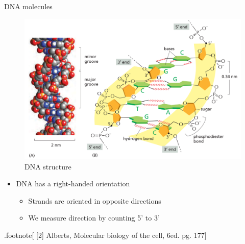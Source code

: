 \documentclass[
  ignorenonframetext,
]{beamer}
\providecommand{\tightlist}{%
  \setlength{\itemsep}{0pt}\setlength{\parskip}{0pt}}
\begin{document}
\begin{frame}{DNA molecules}
\protect\hypertarget{dna-molecules-1}{}

\begin{figure}
\centering
\includegraphics{dna-groove.png}
\caption{DNA structure}
\end{figure}

\begin{itemize}
\tightlist
\item
  DNA has a right-handed orientation

  \begin{itemize}
  \tightlist
  \item
    Strands are oriented in opposite directions
  \item
    We measure direction by counting 5' to 3'
  \end{itemize}
\end{itemize}

.footnote{[} {[}2{]} Alberts, Molecular biology of the cell, 6ed. pg.
177{]}

\end{frame}
\end{document}
